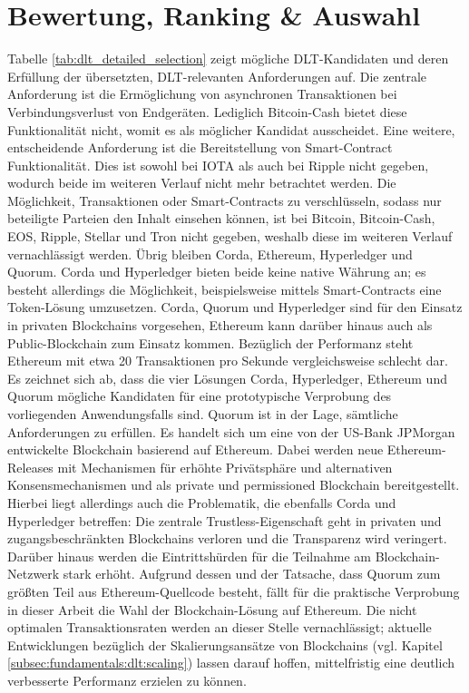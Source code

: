 %
%
\section{Bewertung, Ranking \& Auswahl}
\label{sec:dlt_selection:rating}
Tabelle \ref{tab:dlt_detailed_selection} zeigt mögliche \ac{DLT}-Kandidaten und deren Erfüllung der übersetzten, \ac{DLT}-relevanten Anforderungen auf. Die zentrale Anforderung ist die Ermöglichung von asynchronen Transaktionen bei Verbindungsverlust von Endgeräten. Lediglich Bitcoin-Cash bietet diese Funktionalität nicht, womit es als möglicher Kandidat ausscheidet. Eine weitere, entscheidende Anforderung ist die Bereitstellung von Smart-Contract Funktionalität. Dies ist sowohl bei IOTA als auch bei Ripple nicht gegeben, wodurch beide im weiteren Verlauf nicht mehr betrachtet werden. Die Möglichkeit, Transaktionen oder Smart-Contracts zu verschlüsseln, sodass nur beteiligte Parteien den Inhalt einsehen können, ist bei Bitcoin, Bitcoin-Cash, EOS, Ripple, Stellar und Tron nicht gegeben, weshalb diese im weiteren Verlauf vernachlässigt werden. Übrig bleiben Corda, Ethereum, Hyperledger und Quorum. Corda und Hyperledger bieten beide keine native Währung an; es besteht allerdings die Möglichkeit, beispielsweise mittels Smart-Contracts eine Token-Lösung umzusetzen. Corda, Quorum und Hyperledger sind für den Einsatz in privaten Blockchains vorgesehen, Ethereum kann darüber hinaus auch als Public-Blockchain zum Einsatz kommen. Bezüglich der Performanz steht Ethereum mit etwa 20 Transaktionen pro Sekunde vergleichsweise schlecht dar.\\
Es zeichnet sich ab, dass die vier Lösungen Corda, Hyperledger, Ethereum und Quorum mögliche Kandidaten für eine prototypische Verprobung des vorliegenden Anwendungsfalls sind. Quorum ist in der Lage, sämtliche Anforderungen zu erfüllen. Es handelt sich um eine von der US-Bank JPMorgan entwickelte Blockchain basierend auf Ethereum. Dabei werden neue Ethereum-Releases mit Mechanismen für erhöhte Privätsphäre und alternativen Konsensmechanismen und als private und permissioned Blockchain bereitgestellt. Hierbei liegt allerdings auch die Problematik, die ebenfalls Corda und Hyperledger betreffen: Die zentrale Trustless-Eigenschaft geht in privaten und zugangsbeschränkten Blockchains verloren und die Transparenz wird veringert. Darüber hinaus werden die Eintrittshürden für die Teilnahme am Blockchain-Netzwerk stark erhöht. Aufgrund dessen und der Tatsache, dass Quorum zum größten Teil aus Ethereum-Quellcode besteht, fällt für die praktische Verprobung in dieser Arbeit die Wahl der Blockchain-Lösung auf Ethereum. Die nicht optimalen Transaktionsraten werden an dieser Stelle vernachlässigt; aktuelle Entwicklungen bezüglich der Skalierungsansätze von Blockchains (vgl. Kapitel \ref{subsec:fundamentals:dlt:scaling}) lassen darauf hoffen, mittelfristig eine deutlich verbesserte Performanz erzielen zu können.
